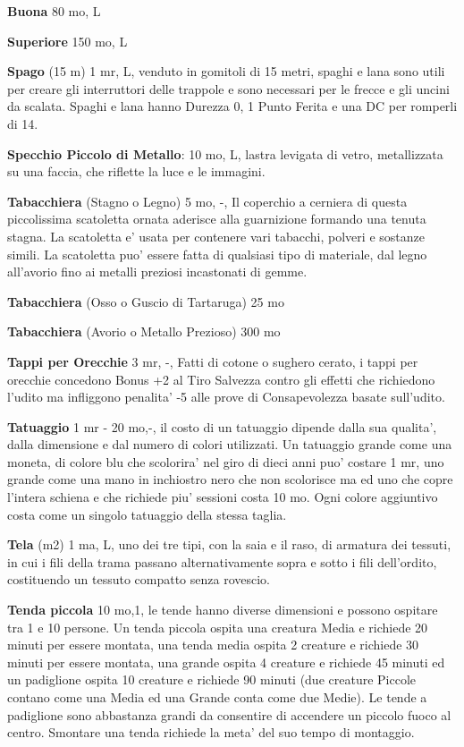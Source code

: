 \documentclass[a4paper,11pt,twoside,openany]{book}
\begin{document}
{		\textbf{Buona} 80 mo, L
		
		\textbf{Superiore} 150 mo, L
		
		\textbf{Spago} (15 m) 1 mr, L, venduto in gomitoli di 15 metri, spaghi e lana sono utili per creare gli interruttori delle trappole e sono necessari per le frecce e gli uncini da scalata. Spaghi e lana hanno Durezza 0, 1 Punto Ferita e una DC per romperli di 14.
		
		\textbf{Specchio Piccolo di Metallo}: 10 mo, L, lastra levigata di vetro, metallizzata su una faccia, che riflette la luce e le immagini.
		
		\textbf{Tabacchiera} (Stagno o Legno) 5 mo, -, Il coperchio a cerniera di questa piccolissima scatoletta ornata aderisce alla guarnizione formando una tenuta stagna. La scatoletta e' usata per contenere vari tabacchi, polveri e sostanze simili. La scatoletta puo' essere fatta di qualsiasi tipo di materiale, dal legno all'avorio fino ai metalli preziosi incastonati di gemme.
		
		\textbf{Tabacchiera} (Osso o Guscio di Tartaruga) 25 mo
		
		\textbf{Tabacchiera} (Avorio o Metallo Prezioso) 300 mo
		
		\textbf{Tappi per Orecchie} 3 mr, -, Fatti di cotone o sughero cerato, i tappi per orecchie concedono Bonus +2 al Tiro Salvezza contro gli effetti che richiedono l'udito ma infliggono penalita' -5 alle prove di Consapevolezza basate sull'udito.
		
		\textbf{Tatuaggio} 1 mr - 20 mo,-, il costo di un tatuaggio dipende dalla sua qualita', dalla dimensione e dal numero di colori utilizzati. Un tatuaggio grande come una moneta, di colore blu che scolorira' nel giro di dieci anni puo' costare 1 mr, uno grande come una mano in inchiostro nero che non scolorisce ma ed uno che copre l'intera schiena e che richiede piu' sessioni costa 10 mo. 
		Ogni colore aggiuntivo costa come un singolo tatuaggio della stessa taglia.
		
		\textbf{Tela} (m2) 1 ma, L, uno dei tre tipi, con la saia e il raso, di armatura dei tessuti, in cui i fili della trama passano alternativamente sopra e sotto i fili dell'ordito, costituendo un tessuto compatto senza rovescio.
		
		\textbf{Tenda piccola} 10 mo,1, le tende hanno diverse dimensioni e possono ospitare tra 1 e 10 persone. Un tenda piccola ospita una creatura Media e richiede 20 minuti per essere montata, una tenda media ospita 2 creature e richiede 30 minuti per essere montata, una grande ospita 4 creature e richiede 45 minuti ed un padiglione ospita 10 creature e richiede 90 minuti (due creature Piccole contano come una Media ed una Grande conta come due Medie). Le tende a padiglione sono abbastanza grandi da consentire di accendere un piccolo fuoco al centro. Smontare una tenda richiede la meta' del suo tempo di montaggio.
		
}
\end{document}
